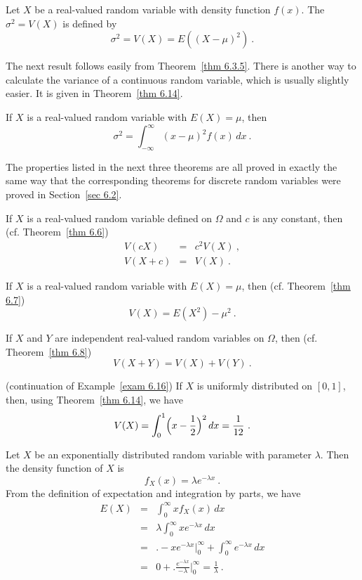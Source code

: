 {\begin{definition}\label{def 6.6}  Let $X$ be a real-valued random variable with
density function $f(x)$.  The   $\sigma^2 = V(X)$ is defined by
$$
\sigma^2 = V(X) = E((X - \mu)^2)\ . 
$$
\end{definition}   
The next result follows easily from Theorem~\ref{thm 6.3.5}.  There is another
way to calculate the variance of a continuous random variable, which is usually
slightly easier.  It is given in Theorem~\ref{thm 6.14}.
\begin{theorem}\label{thm 6.13.5} If $X$ is a real-valued random variable with $E(X)
= \mu$, then
$$
\sigma^2 = \int_{-\infty}^\infty (x - \mu)^2 f(x)\, dx\ .
$$
\end{theorem}
\par The properties listed in the next three theorems are all proved in exactly the
same way that the corresponding theorems for discrete random variables were proved in
Section~\ref{sec 6.2}.
\begin{theorem}\label{thm 6.13} If $X$ is a real-valued random variable defined on
$\Omega$ and $c$ is any constant, then (cf. Theorem~\ref{thm 6.6})
\begin{eqnarray*}
V(cX)    &=& c^2 V(X)\ , \\ 
V(X + c) &=& V(X)\ .
\end{eqnarray*}
\end{theorem}

\begin{theorem}\label{thm 6.14} If $X$ is a real-valued random variable with $E(X) =
\mu$, then (cf. Theorem~\ref{thm 6.7})
$$ V(X) = E(X^2) - \mu^2\ .
$$
\end{theorem}

\begin{theorem}\label{thm 6.15} If $X$ and $Y$ are independent real-valued random
variables on $\Omega$, then (cf. Theorem~\ref{thm 6.8})
$$ V(X + Y) = V(X) + V(Y)\ .
$$
\end{theorem}

\begin{example} (continuation of Example~\ref{exam 6.16})\label{exam 6.18.5} If
$X$ is uniformly distributed on $[0, 1]$, then, using Theorem~\ref{thm 6.14}, we have
$$  V(X) = \int_0^1 \Bigl(x - \frac 12 \Bigr)^2\, dx = \frac 1{12}\ .
$$
\end{example}

\begin{example}\label{exam 6.21} Let $X$ be an exponentially distributed random
variable with parameter $\lambda$.  Then the density function of $X$ is
$$ f_X(x) = \lambda e^{-\lambda x}\ .
$$ From the definition of expectation and integration by parts, we have
\begin{eqnarray*} E(X) & = & \int_0^\infty x f_X(x)\, dx \\
     & = & \lambda \int_0^\infty x e^{-\lambda x}\, dx \\
     & = & \biggl.-xe^{-\lambda x}\biggr|_0^\infty + \int_0^\infty e^{-\lambda x}\,
dx \\
     & = & 0 + \biggl.\frac {e^{-\lambda x}}{-\lambda}\biggr|_0^\infty =
\frac 1\lambda\ .
\end{eqnarray*}


\end{example}}
